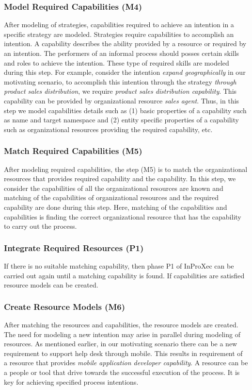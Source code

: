\subsubsection{Model Required Capabilities (M4)}  
After modeling of strategies, capabilities required to achieve an intention in a specific strategy are modeled. Strategies require capabilities to accomplish an intention. A capability describes the ability provided by a resource or required by an intention. The performers of an informal process should posses certain skills and roles to achieve the intention. These type of required skills are modeled during this step. For example, consider the intention \textit{expand geographically} in our motivating scenario, to accomplish this intention through the strategy \textit{through product sales distribution}, we require \textit{product sales distribution capability}. This capability can be provided by organizational resource \textit{sales agent}. Thus, in this step we model capabilities details such as (1) basic properties of a capability such as name and target namespace and (2) entity specific properties of a capability such as organizational resources providing the required capability, etc.

\subsubsection{Match Required Capabilities (M5)} 
After modeling required capabilities, the step (M5) is to match the organizational resources that provides required capability and the capability. In this step, we consider the capabilities of all the organizational resources are known and matching of the capabilities of organizational resources and the required capability are done during this step. Here, matching of the capabilities and capabilities is finding the correct organizational resource that has the capability to carry out the process. 

\subsubsection{Integrate Required Resources (P1)} 
If there is no suitable matching capability, then phase P1 of InProXec can be carried out again until a matching capability is found. If capabilities are satisfied resource models can be created.

\subsubsection{Create Resource Models (M6)}  
After matching the resources and capabilities, the resource models are created. The need for modeling a new intention may arise in parallel during modeling of resources. As mentioned earlier, in our motivating scenario there can be a new requirement to support help desk through mobile. This results in requirement of a resource that provides \textit{mobile application developer capability}. A resource can be a people or tool that drive towards the successful execution of the process. It is key for achieving specified process intentions. 

